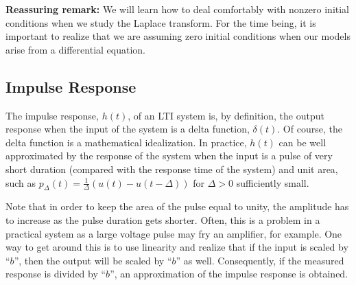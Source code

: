 \documentclass[a4paper]{article}
\begin{document}
\textbf{Reassuring remark:} We will learn how to deal comfortably with nonzero initial conditions when we study the Laplace transform. For the time being, it is important to realize that we are assuming zero initial conditions when our models arise from a differential equation.
\subsection{Impulse Response}
The impulse response, $h(t)$, of an LTI system is, by definition, the output response when the input of the system is a delta function, $\delta(t)$. Of course, the delta function is a mathematical idealization. In practice, $h(t)$ can be well approximated by the response of the system when the input is a pulse of very short duration (compared with the response time of the system) and unit area, such as $p_\Delta(t)=\frac{1}{\Delta}(u(t)-u(t-\Delta))$ for $\Delta>0$ sufficiently small.

Note that in order to keep the area of the pulse equal to unity, the amplitude has to increase as the pulse duration gets shorter. Often, this is a problem in a practical system as a large voltage pulse may fry an amplifier, for example. One way to get around this is to use linearity and realize that if the input is scaled by ``$b$'', then the output will be scaled by ``$b$'' as well. Consequently, if the measured response is divided by ``$b$'', an approximation of the impulse response is obtained.
\end{document}
